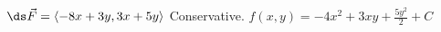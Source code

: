 {$\ds\vec{F} =\left<-8x+3y, 3x+5y\right>$
}
{Conservative.  $f(x,y) = - 4 x^{2} + 3 x y + \frac{5 y^{2}}{2} + C$}
